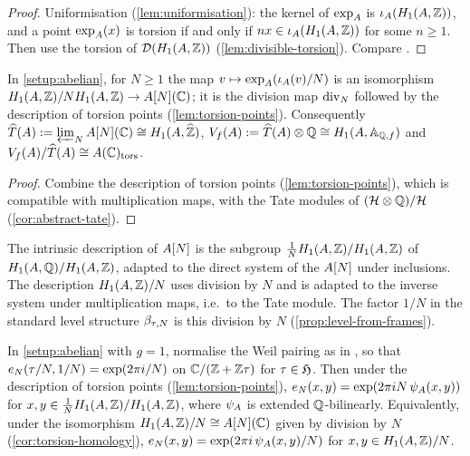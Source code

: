 \begin{proof}
Uniformisation (\cref{lem:uniformisation}): the kernel of $\exp_{A}$ is
$\iota_{A}(H_{1}(A,\mathbb{Z}))$, and a point $\exp_{A}(x)$ is
torsion if and only if $nx \in \iota_{A}(H_{1}(A,\mathbb{Z}))$ for
some $n \geq 1$. Then use the torsion of
$\mathcal{D}(H_{1}(A,\mathbb{Z}))$ (\cref{lem:divisible-torsion}).
Compare \cite[IV.5.2]{DeligneRapoport1973}.
\end{proof}

\begin{corollary}\label{cor:torsion-homology}
In \cref{setup:abelian}, for $N \geq 1$ the map
$v \mapsto \exp_{A}(\iota_{A}(v)/N)$ is an isomorphism
$H_{1}(A,\mathbb{Z})/NH_{1}(A,\mathbb{Z}) \to A[N](\mathbb{C})$; it is the
division map $\mathrm{div}_{N}$ followed by the description of torsion
points (\cref{lem:torsion-points}). Consequently
$\widehat{T}(A) := \varprojlim_N A[N](\mathbb{C}) \cong H_{1}(A,\widehat{\mathbb{Z}})$,
$V_{f}(A) := \widehat{T}(A)\otimes\mathbb{Q} \cong
H_{1}(A,\mathbb{A}_{\mathbb{Q},f})$ and
$V_{f}(A)/\widehat{T}(A) \cong A(\mathbb{C})_{\mathrm{tors}}$.
\end{corollary}

\begin{proof}
Combine the description of torsion points (\cref{lem:torsion-points}),
which is compatible with multiplication maps, with the Tate modules of
$(\mathcal{H}\otimes\mathbb{Q})/\mathcal{H}$ (\cref{cor:abstract-tate}).
\end{proof}

\begin{remark}
The intrinsic description of $A[N]$ is the subgroup
$\tfrac{1}{N}H_{1}(A,\mathbb{Z})/H_{1}(A,\mathbb{Z})$ of
$H_{1}(A,\mathbb{Q})/H_{1}(A,\mathbb{Z})$, adapted to the direct system of the
$A[N]$ under inclusions. The description $H_{1}(A,\mathbb{Z})/N$
uses division by $N$ and is adapted to the inverse system under
multiplication maps, i.e.\ to the Tate module. The factor $1/N$ in the
standard level structure $\beta_{\tau,N}$ is this division by $N$
(\cref{prop:level-from-frames}).
\end{remark}

\begin{lemma}\label{lem:weil-riemann}
In \cref{setup:abelian} with $g = 1$, normalise the Weil pairing as in
\cite{DiamondShurman2005}, so that $e_{N}(\tau/N, 1/N) =
\exp(2\pi i/N)$ on $\mathbb{C}/(\mathbb{Z}+\mathbb{Z}\tau)$ for $\tau \in \mathfrak{H}$. Then
under the description of torsion points (\cref{lem:torsion-points}),
$e_{N}(x, y) = \exp(2\pi i N\,\psi_{A}(x,y))$ for
$x, y \in \tfrac{1}{N}H_{1}(A,\mathbb{Z})/H_{1}(A,\mathbb{Z})$, where
$\psi_{A}$ is extended $\mathbb{Q}$-bilinearly. Equivalently, under the
isomorphism $H_{1}(A,\mathbb{Z})/N \cong A[N](\mathbb{C})$ given by
division by $N$ (\cref{cor:torsion-homology}),
$e_{N}(x, y) = \exp(2\pi i\,\psi_{A}(x,y)/N)$ for
$x, y \in H_{1}(A,\mathbb{Z})/N$.
\end{lemma}

